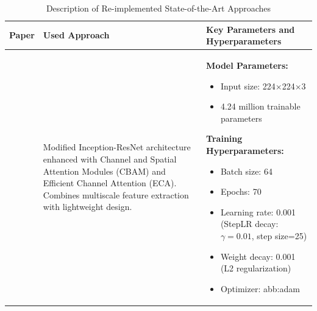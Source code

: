 \begin{table}[H]
\centering
\renewcommand{\arraystretch}{1.4}
\setlength{\tabcolsep}{6pt}
\caption{Description of Re-implemented State-of-the-Art Approaches}
\label{tab:sota_studies}
\begin{tabular}{|p{2.5cm}|p{5cm}|p{5.5cm}|}
\hline
\textbf{Paper} & \textbf{Used Approach} & \textbf{Key Parameters and Hyperparameters} \\
\hline


\textit{\parencite{fang2023lightweight}} & 
Modified Inception-ResNet architecture enhanced with Channel and Spatial Attention Modules (CBAM) and Efficient Channel Attention (ECA). Combines multiscale feature extraction with lightweight design. & 
\textbf{Model Parameters:}
\begin{itemize}[leftmargin=*,noitemsep]
    \item Input size: 224×224×3
    \item 4.24 million trainable parameters
\end{itemize}
\textbf{Training Hyperparameters:}
\begin{itemize}[leftmargin=*,noitemsep]
    \item Batch size: 64
    \item Epochs: 70
    \item Learning rate: 0.001 (StepLR decay: $\gamma=0.01$, step size=25)
    \item Weight decay: 0.001 (L2 regularization)
    \item Optimizer: \gls{abb:adam}
\end{itemize} \\
\hline


\end{tabular}
\end{table}
